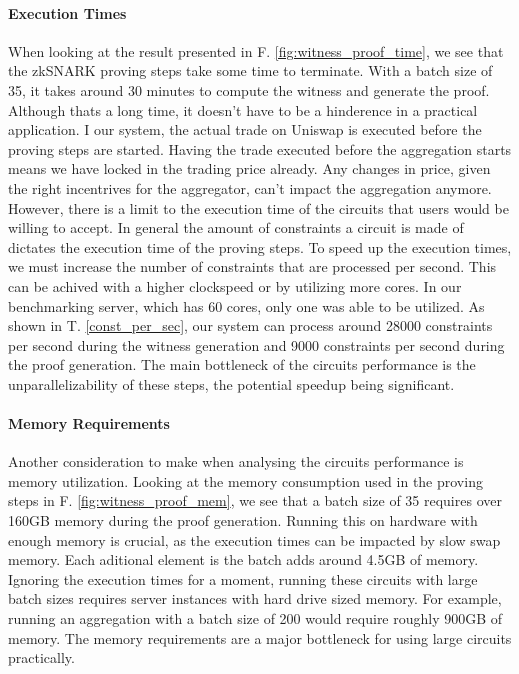 \documentclass[../../thesis.tex]{subfiles}
\begin{document}
\paragraph{Execution Times}
When looking at the result presented in F. \ref{fig:witness_proof_time}, we see that the zkSNARK proving steps take some time to terminate. With a batch size of 35, it takes around 30 minutes to compute the witness and generate the proof. Although thats a long time, it doesn't have to be a hinderence in a practical application. I  our system, the actual trade on Uniswap is executed before the proving steps are started. Having the trade executed before the aggregation starts means we have locked in the trading price already. Any changes in price, given the right incentrives for the aggregator, can't impact the aggregation anymore. However, there is a limit to the execution time of the circuits that users would be willing to accept. In general the amount of constraints a circuit is made of dictates the execution time of the proving steps. To speed up the execution times, we must increase the number of constraints that are processed per second. This can be achived with a higher clockspeed or by utilizing more cores. In our benchmarking server, which has 60 cores, only one was able to be utilized. As shown in T. \ref{const_per_sec}, our system can process around 28000 constraints per second during the witness generation and 9000 constraints per second during the proof generation. The main bottleneck of the circuits performance is the unparallelizability of these steps, the potential speedup being significant. 

\paragraph{Memory Requirements}
Another consideration to make when analysing the circuits performance is memory utilization. Looking at the memory consumption used in the proving steps in F. \ref{fig:witness_proof_mem}, we see that a batch size of 35 requires over 160GB memory during the proof generation. Running this on hardware with enough memory is crucial, as the execution times can be impacted by slow swap memory. Each aditional element is the batch adds around 4.5GB of memory. Ignoring the execution times for a moment, running these circuits with large batch sizes requires server instances with hard drive sized memory. For example, running an aggregation with a batch size of 200 would require roughly 900GB of memory. The memory requirements are a major bottleneck for using large circuits practically. 
\end{document}

